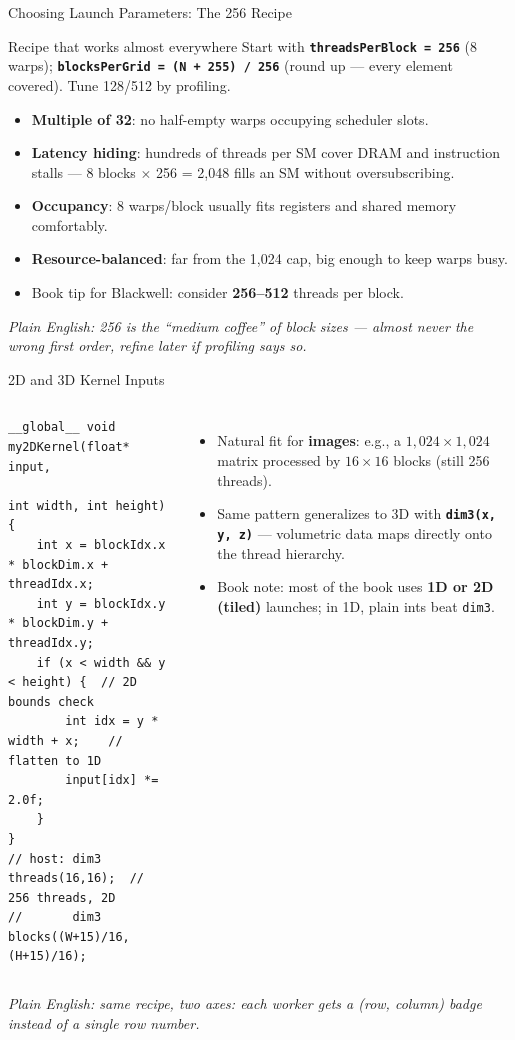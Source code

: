 \documentclass[aspectratio=169]{beamer}
\newcommand{\kw}[1]{\textbf{\textcolor{kwblue}{#1}}}
\newcommand{\pe}[1]{{\footnotesize\itshape Plain English: #1}}
\begin{document}
\begin{frame}{Choosing Launch Parameters: The 256 Recipe}
  \begin{block}{Recipe that works almost everywhere}
    Start with \kw{\texttt{threadsPerBlock = 256}} (8 warps);
    \kw{\texttt{blocksPerGrid = (N + 255) / 256}} (round up --- every element covered). Tune 128/512 by profiling.
  \end{block}
  \begin{itemize}
    \item \kw{Multiple of 32}: no half-empty warps occupying scheduler slots.
    \item \kw{Latency hiding}: hundreds of threads per SM cover DRAM and instruction stalls ---
          8 blocks $\times$ 256 = 2{,}048 fills an SM without oversubscribing.
    \item \kw{Occupancy}: 8 warps/block usually fits registers and shared memory comfortably.
    \item \kw{Resource-balanced}: far from the 1{,}024 cap, big enough to keep warps busy.
    \item Book tip for Blackwell: consider \kw{256--512} threads per block.
  \end{itemize}
  \medskip
  \pe{256 is the ``medium coffee'' of block sizes --- almost never the wrong first order, refine later if profiling says so.}
\end{frame}

\begin{frame}[fragile]{2D and 3D Kernel Inputs}
  \begin{columns}[t]
\begin{lstlisting}
__global__ void my2DKernel(float* input,
                           int width, int height) {
    int x = blockIdx.x * blockDim.x + threadIdx.x;
    int y = blockIdx.y * blockDim.y + threadIdx.y;
    if (x < width && y < height) {  // 2D bounds check
        int idx = y * width + x;    // flatten to 1D
        input[idx] *= 2.0f;
    }
}
// host: dim3 threads(16,16);  // 256 threads, 2D
//       dim3 blocks((W+15)/16, (H+15)/16);
\end{lstlisting}
    \begin{itemize}
      \item Natural fit for \kw{images}: e.g., a $1{,}024 \times 1{,}024$ matrix processed by
            $16 \times 16$ blocks (still 256 threads).
      \item Same pattern generalizes to 3D with \kw{\texttt{dim3(x, y, z)}} ---
            volumetric data maps directly onto the thread hierarchy.
      \item Book note: most of the book uses \kw{1D or 2D (tiled)} launches;
            in 1D, plain ints beat \texttt{dim3}.
    \end{itemize}
  \end{columns}
  \medskip
  \pe{same recipe, two axes: each worker gets a (row, column) badge instead of a single row number.}
\end{frame}
\end{document}
